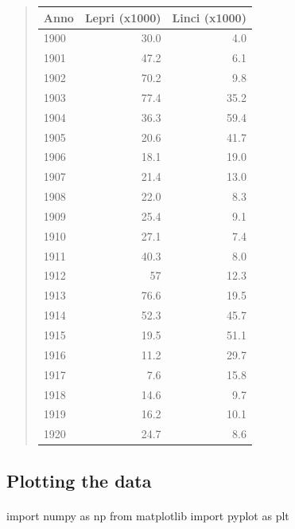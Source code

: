 \documentclass[%
oneside,                 %
final,                   %
10pt]{article}
\begin{document}
\begin{quote}
\begin{tabular}{lrr}
\hline
\multicolumn{1}{c}{ Anno } & \multicolumn{1}{c}{ Lepri (x1000) } & \multicolumn{1}{c}{ Linci (x1000) } \\
\hline
1900 & 30.0          & 4.0           \\
1901 & 47.2          & 6.1           \\
1902 & 70.2          & 9.8           \\
1903 & 77.4          & 35.2          \\
1904 & 36.3          & 59.4          \\
1905 & 20.6          & 41.7          \\
1906 & 18.1          & 19.0          \\
1907 & 21.4          & 13.0          \\
1908 & 22.0          & 8.3           \\
1909 & 25.4          & 9.1           \\
1910 & 27.1          & 7.4           \\
1911 & 40.3          & 8.0           \\
1912 & 57            & 12.3          \\
1913 & 76.6          & 19.5          \\
1914 & 52.3          & 45.7          \\
1915 & 19.5          & 51.1          \\
1916 & 11.2          & 29.7          \\
1917 & 7.6           & 15.8          \\
1918 & 14.6          & 9.7           \\
1919 & 16.2          & 10.1          \\
1920 & 24.7          & 8.6           \\
\hline
\end{tabular}
\end{quote}

\noindent





\subsection{Plotting the data}


\paragraph{}
\bpypro
import numpy as np
from  matplotlib import pyplot as plt
\end{document}
